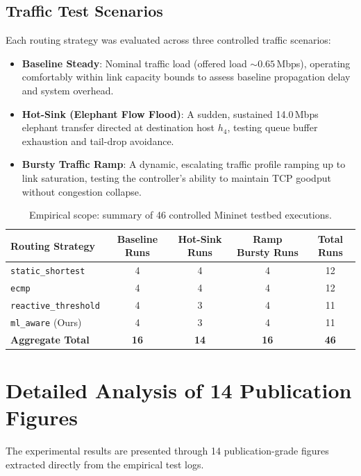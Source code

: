\subsection{Traffic Test Scenarios}
Each routing strategy was evaluated across three controlled traffic scenarios:
\begin{itemize}
  \item \textbf{Baseline Steady}: Nominal traffic load (offered load $\sim 0.65$\,Mbps), operating comfortably within link capacity bounds to assess baseline propagation delay and system overhead.
  \item \textbf{Hot-Sink (Elephant Flow Flood)}: A sudden, sustained 14.0\,Mbps elephant transfer directed at destination host $h_4$, testing queue buffer exhaustion and tail-drop avoidance.
  \item \textbf{Bursty Traffic Ramp}: A dynamic, escalating traffic profile ramping up to link saturation, testing the controller's ability to maintain TCP goodput without congestion collapse.
\end{itemize}

\begin{table}[H]
  \centering
  \small
  \caption{Empirical scope: summary of 46 controlled Mininet testbed executions.}
  \label{tab:experiments_summary}
  \begin{tabular}{l c c c c}
    \toprule
    \textbf{Routing Strategy} & \textbf{Baseline Runs} & \textbf{Hot-Sink Runs} & \textbf{Ramp Bursty Runs} & \textbf{Total Runs} \\
    \midrule
    \texttt{static\_shortest} & 4 & 4 & 4 & 12 \\
    \texttt{ecmp} & 4 & 4 & 4 & 12 \\
    \texttt{reactive\_threshold} & 4 & 3 & 4 & 11 \\
    \texttt{ml\_aware} (Ours) & 4 & 3 & 4 & 11 \\
    \midrule
    \textbf{Aggregate Total} & \textbf{16} & \textbf{14} & \textbf{16} & \textbf{46} \\
    \bottomrule
  \end{tabular}
\end{table}

\section{Detailed Analysis of 14 Publication Figures}
The experimental results are presented through 14 publication-grade figures extracted directly from the empirical test logs.

